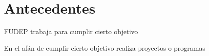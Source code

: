 \section{Antecedentes}

FUDEP trabaja para cumplir cierto objetivo

En el afán de cumplir cierto objetivo realiza proyectos o programas



